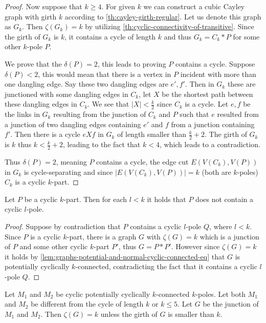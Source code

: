 \documentclass[12pt, twoside]{book}
\begin{document}
\begin{proof}
	Now suppose that $k\geq 4$. For given $k$ we can construct a cubic Cayley graph with girth $k$ according to \cref{th:cayley-girth-regular}. Let us denote this graph as $G_k$. Then $\zeta(G_k)=k$ by utilizing \cref{th:cyclic-connectivity-of-transitive}. Since the girth of $G_k$ is $k$, it contains a cycle of length $k$ and thus $G_k=C_k*P$ for some other $k$-pole $P$.
	
	We prove that the $\delta(P)=2$, this leads to proving $P$ contains a cycle. Suppose $\delta(P)<2$, this would mean that there is a vertex in $P$ incident with more than one dangling edge. Say these two dangling edges are $e',f'$. Then in $G_k$ these are junctioned with some dangling edges in $C_k$, let $X$ be the shortest path between these dangling edges in $C_k$. We see that $|X|<\frac{k}{2}$ since $C_k$ is a cycle. Let $e,f$ be the links in $G_k$ resulting from the junction of $C_k$ and $P$ such that $e$ resulted from a junction of two dangling edges containing $e'$ and $f$ from a junction containing $f'$. Then there is a cycle $eXf$ in $G_k$ of length smaller than $\frac{k}{2}+2$. The girth of $G_k$ is $k$ thus $k<\frac{k}{2}+2$, leading to the fact that $k<4$, which leads to a contradiction. 
	
	Thus $\delta(P)=2$, meaning $P$ contains a cycle, the edge cut $E(V(C_k), V(P))$ in $G_k$ is cycle-separating and since $|E(V(C_k), V(P))|=k$ (both are $k$-poles) $C_k$ is a cyclic $k$-part.
\end{proof}

\begin{lemma}\label{lem:cyclic-part-no-small-cyclic-l-pole}
	Let $P$ be a cyclic $k$-part. Then for each $l<k$ it holds that $P$ does not contain a cyclic $l$-pole.
\end{lemma}

\begin{proof}
	Suppose by contradiction that $P$ contains a cyclic $l$-pole $Q$, where $l<k$. Since $P$ is a cyclic $k$-part, there is a graph $G$ with $\zeta(G)=k$ which is a junction of $P$ and some other cyclic $k$-part $P'$, thus $G=P*P'$. However since $\zeta(G)=k$ it holds by \cref{lem:graphs-potential-and-normal-cyclic-connected-eq} that $G$ is potentially cyclically $k$-connected, contradicting the fact that it contains a cyclic $l$-pole $Q$.
\end{proof}


\begin{theorem}\label{th:junction-of-kpoles-cyclic-edge-connectivity}
	Let $M_1$ and $M_2$ be cyclic potentially cyclically $k$-connected $k$-poles. Let both $M_1$ and $M_2$ be different from the cycle of length $k$ or $k\leq 5$. Let $G$ be the junction of $M_1$ and $M_2$. Then $\zeta(G)=k$ unless the girth of $G$ is smaller than $k$.
\end{theorem}
\end{document}

